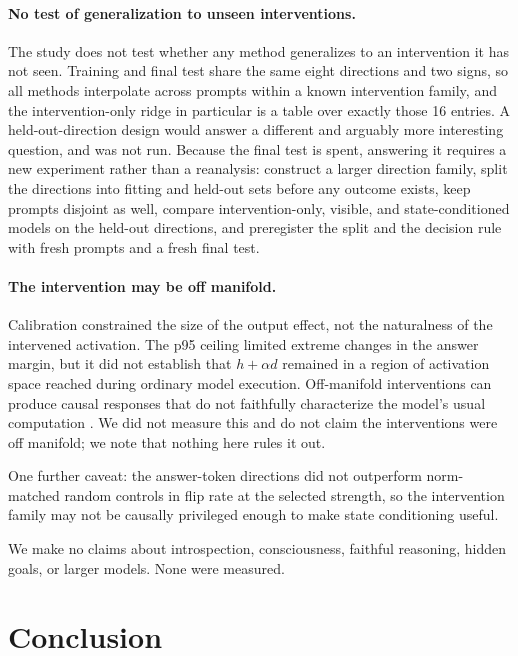 \documentclass{article}
\begin{document}
\paragraph{No test of generalization to unseen interventions.} The study does not test whether any
method generalizes to an intervention it has not seen. Training and final test share the same eight
directions and two signs, so all methods interpolate across prompts within a known intervention
family, and the intervention-only ridge in particular is a table over exactly those 16 entries. A
held-out-direction design would answer a different and arguably more interesting question, and was
not run. Because the final test is spent, answering it requires a new experiment rather than a
reanalysis: construct a larger direction family, split the directions into fitting and held-out sets
before any outcome exists, keep prompts disjoint as well, compare intervention-only, visible, and
state-conditioned models on the held-out directions, and preregister the split and the decision rule
with fresh prompts and a fresh final test.

\paragraph{The intervention may be off manifold.} Calibration constrained the size of the output
effect, not the naturalness of the intervened activation. The p95 ceiling limited extreme changes in
the answer margin, but it did not establish that $h + \alpha d$ remained in a region of activation
space reached during ordinary model execution. Off-manifold interventions can produce causal
responses that do not faithfully characterize the model's usual computation
\citep{makelov2024subspace}. We did not measure this and do not claim the interventions were off
manifold; we note that nothing here rules it out.

One further caveat: the answer-token directions did not outperform norm-matched random controls in
flip rate at the selected strength, so the intervention family may not be causally privileged enough
to make state conditioning useful.

We make no claims about introspection, consciousness, faithful reasoning, hidden goals, or larger
models. None were measured.

\section{Conclusion}
\end{document}
